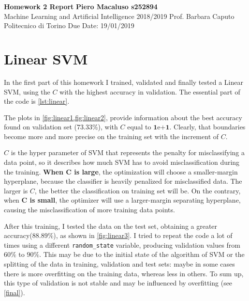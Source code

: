 \documentclass[a4paper, 11pt]{article}
\begin{document}
	\noindent
	\large\textbf{Homework 2 Report} \hfill \textbf{Piero Macaluso s252894} \\
	\normalsize Machine Learning and Artificial Intelligence 2018/2019 \hfill Prof. Barbara Caputo  \\
	\normalsize Politecnico di Torino \hfill Due Date: 19/01/2019 
	
	\section{Linear SVM} \label{linearsvm}
	
	In the first part of this homework I trained, validated and finally tested a Linear SVM, using the $C$ with the highest accuracy in validation. The essential part of the code is \vref{lst:linear}.
	
	
%	
%	
	
	The plots in \vref{fig:linear1,fig:linear2}, provide information about the best accuracy found on validation set ($\boldsymbol{73.33\%}$), with $C$ equal to  $\boldsymbol{1\mathrm{e}{+1}}$. Clearly, that boundaries become more and more precise on the training set with the increment of $C$. 
	
	$C$ is the hyper parameter of SVM that represents the penalty for misclassifying a data point, so it describes how much SVM has to avoid misclassification during the training.
	\textbf{When $\boldsymbol{C}$ is large}, the optimization will choose a smaller-margin hyperplane, because the classifier is heavily penalized for misclassified data.
	The larger is $C$, the better the classification on training set will be. On the contrary, when \textbf{$\boldsymbol{C}$ is small}, the optimizer will use a larger-margin separating hyperplane, causing the misclassification of more training data points.
	
	After this training, I tested the data on the test set, obtaining a greater accuracy($\boldsymbol{88.89\%}$), as shown in \vref{fig:linear3}.  I tried to repeat the code a lot of times using a different \texttt{random\_state} variable, producing validation values from $60\%$ to $90\%$. This may be due to the initial state of the algorithm of SVM or the splitting of the data in training, validation and test sets: maybe in some cases there is more overfitting on the training data, whereas less in others. To sum up, this type of validation is not stable and may be influenced by overfitting (see \vref{final}).
\end{document}
